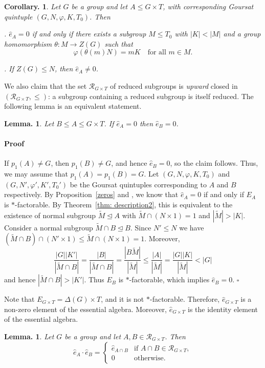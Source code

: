 \documentclass[12pt]{article}
\theoremstyle{change}
\newtheorem{lem}[theorem]{Lemma.}
\newtheorem{coro}[theorem]{Corollary.}
\newenvironment{proof}{\paragraph{Proof}}{\hfill$\square$}
\renewcommand{\le}{\leqslant} %
\newcommand{\calR}{\mathcal{R}}
\newcommand{\1}{{\bf 1}}
\begin{document}
\begin{coro}
\label{desTabel}
Let $G$ be a group and let $A \leq G\times T$, with corresponding Goursat quintuple $(G, N, \varphi, K, T_0)$. Then 

\smallskip 

. $\widehat{e}_A=0$ if and only if there exists a subgroup $M \leq T_0$ with $|K| < |M|$ and a group homomorphism $\theta : M \to Z(G)$ such that
\[
\varphi(\theta(m)N) = mK \quad \text{for all } m \in M.
\]

\smallskip 

. If $Z(G) \leq N$, then $\widehat{e}_A \neq 0$.

\end{coro}

We also claim that the set $\calR_{G\times T}$ of reduced subgroups is \emph{upward} closed in $(\calR_{G\times T},\le)$: a subgroup containing a reduced subgroup is itself reduced. The following lemma is an equivalent statement.

\begin{lem}
\label{lem: topdown}
Let $B\leq A\leq G\times T$. If $\widehat{e}_A=0$ then $\widehat{e}_B=0$.
\end{lem}
\begin{proof}
If $p_1(A) \neq G$, then $p_1(B) \neq G$, and hence $\widehat{e}_B=0$, so the claim follows. Thus, we may assume that $p_1(A)=p_1(B)=G$. Let $(G,N,\varphi,K,T_0)$ and $(G,N',\varphi',K',T_0')$ be the Goursat quintuples corresponding to $A$ and $B$ respectively. By Proposition~\ref{zeros} and \cite[Lemma 3.2]{R1}, we know that $\widehat{e}_A = 0$ if and only if $E_A$ is $\ast$-factorable. By Theorem~\ref{thm: description2}, this is equivalent to the existence of normal subgroup $\widetilde{M}\unlhd A$ with $\widetilde{M}\cap (N\times 1) = 1$ and $|\widetilde{M}|>|K|$. Consider a normal subgroup $\widetilde{M}\cap B\unlhd B$. Since $N'\leq N$ we have $(\widetilde{M}\cap B)\cap (N'\times 1)\leq \widetilde{M}\cap (N\times 1)=1$. Moreover, 
\[\frac{|G||K'|}{|\widetilde{M}\cap B|}=\frac{|B|}{|\widetilde{M}\cap B|}=\frac{|B\widetilde{M}|}{|\widetilde{M}|} \leq \frac{|A|}{|\widetilde{M}|} = \frac{|G||K|}{|\widetilde{M}|}<|G|\]
and hence $|\widetilde{M}\cap B|>|K'|$. Thus $E_B$ is $\ast$-factorable, which implies $\widehat{e}_B=0$.
\end{proof}

Note that \(E_{G\times T}=\Delta(G)\times T\), and it is not $\ast$-factorable. Therefore, \(\widehat{e}_{G\times T}\) is a non-zero element of the essential algebra. Moreover, \(\widehat{e}_{G\times T}\) is the identity element of the essential algebra.
\begin{lem}
\label{ipots1}
Let \(G\) be a group and let \(A,B \in \calR_{G\times T}\). Then
$$
\widehat{e}_A\cdot \widehat{e}_B =
\begin{cases}
\widehat{e}_{A\cap B} & \text{if } A \cap B \in \calR_{G\times T},\\[6pt]
0 & \text{otherwise}.
\end{cases}
$$
\end{lem}
\end{document}
